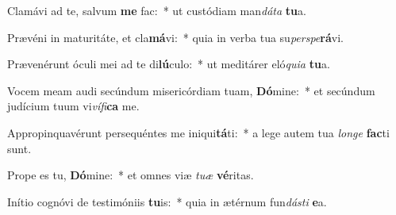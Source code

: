 \item Clamávi ad te, salvum \textbf{me} fac:~* ut custódiam man\textit{dá}\textit{ta} \textbf{tu}a.
\item Prævéni in maturitáte, et cla\textbf{má}vi:~* quia in verba tua su\textit{per}\textit{spe}\textbf{rá}vi.
\item Prævenérunt óculi mei ad te di\textbf{lú}culo:~* ut meditárer eló\textit{qui}\textit{a} \textbf{tu}a.
\item Vocem meam audi secúndum misericórdiam tuam, \textbf{Dó}mine:~* et secúndum judícium tuum vi\textit{ví}\textit{fi}\textbf{ca} me.
\item Appropinquavérunt persequéntes me iniqui\textbf{tá}ti:~* a lege autem tua \textit{lon}\textit{ge} \textbf{fac}ti sunt.
\item Prope es tu, \textbf{Dó}mine:~* et omnes viæ \textit{tu}\textit{æ} \textbf{vé}ritas.
\item Inítio cognóvi de testimóniis \textbf{tu}is:~* quia in ætérnum fun\textit{dás}\textit{ti} \textbf{e}a.
